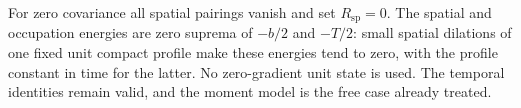For zero covariance all spatial pairings vanish and set $R_{\mathrm{sp}} = 0$.
The spatial and occupation energies are zero suprema of $-b/2$ and $-T/2$: small
spatial dilations of one fixed unit compact profile make these energies tend to
zero, with the profile constant in time for the latter. No zero-gradient unit
state is used. The temporal identities remain valid, and the moment model is the
free case already treated.
